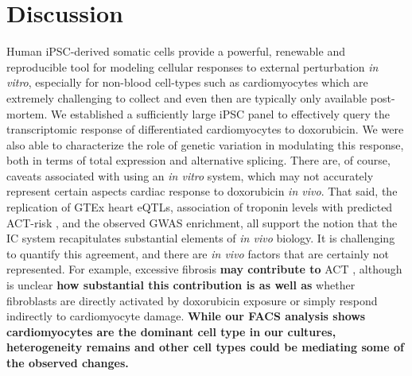 \documentclass[9pt,lineno]{elife}
\newcommand{\tempbold}[1]{\textbf{#1}}
\begin{document}
\section*{Discussion}

Human iPSC-derived somatic cells provide a powerful, renewable and reproducible tool for modeling cellular responses to external perturbation \emph{in vitro}, especially for non-blood cell-types such as cardiomyocytes which are extremely challenging to collect and even then are typically only available post-mortem. 
We established a sufficiently large iPSC panel to effectively query the transcriptomic response of differentiated cardiomyocytes to doxorubicin. We were also able to characterize the role of genetic variation in modulating this response, both in terms of total expression and alternative splicing. 
There are, of course, caveats associated with using an \emph{in vitro} system, which may not accurately represent certain aspects cardiac response to doxorubicin \emph{in vivo}. 
That said, the replication of GTEx heart eQTLs, association of troponin levels with predicted ACT-risk \citep{Burridge2016}, and the observed GWAS enrichment, all support the notion that the IC system recapitulates substantial elements of \emph{in vivo} biology. 
It is challenging to quantify this agreement, and there are \emph{in vivo} factors that are certainly not represented. For example, excessive fibrosis \tempbold{may contribute to} ACT \citep{cascales2013association,zhan2016ataxia,farhad2016characterization,Heck2017-jc}, although is unclear \tempbold{how substantial this contribution is as well as} whether fibroblasts are directly activated by doxorubicin exposure or simply respond indirectly to cardiomyocyte damage. \tempbold{While our FACS analysis shows cardiomyocytes are the dominant cell type in our cultures, heterogeneity remains and other cell types could be mediating some of the observed changes.}
\end{document}
